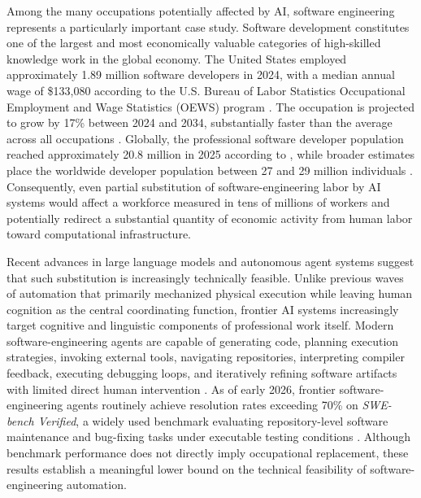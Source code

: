 \documentclass{article}
\begin{document}

Among the many occupations potentially affected by AI, software engineering represents a particularly important case study. Software development constitutes one of the largest and most economically valuable categories of high-skilled knowledge work in the global economy. The United States employed approximately 1.89 million software developers in 2024, with a median annual wage of \$133,080 according to the U.S. Bureau of Labor Statistics Occupational Employment and Wage Statistics (OEWS) program \citep{bls2024oes}. The occupation is projected to grow by 17\% between 2024 and 2034, substantially faster than the average across all occupations \citep{bls2024ooh}. Globally, the professional software developer population reached approximately 20.8 million in 2025 according to \citet{jetbrains2025survey}, while broader estimates place the worldwide developer population between 27 and 29 million individuals \citep{evans2025developers}. Consequently, even partial substitution of software-engineering labor by AI systems would affect a workforce measured in tens of millions of workers and potentially redirect a substantial quantity of economic activity from human labor toward computational infrastructure.

Recent advances in large language models and autonomous agent systems suggest that such substitution is increasingly technically feasible. Unlike previous waves of automation that primarily mechanized physical execution while leaving human cognition as the central coordinating function, frontier AI systems increasingly target cognitive and linguistic components of professional work itself. Modern software-engineering agents are capable of generating code, planning execution strategies, invoking external tools, navigating repositories, interpreting compiler feedback, executing debugging loops, and iteratively refining software artifacts with limited direct human intervention \citep{santos2026decoding, hosseini2025roleofai, wang2025agentic, patil2025bfcl}. As of early 2026, frontier software-engineering agents routinely achieve resolution rates exceeding 70\% on \textit{SWE-bench Verified}, a widely used benchmark evaluating repository-level software maintenance and bug-fixing tasks under executable testing conditions \citep{swebench2026}. Although benchmark performance does not directly imply occupational replacement, these results establish a meaningful lower bound on the technical feasibility of software-engineering automation.
\end{document}
